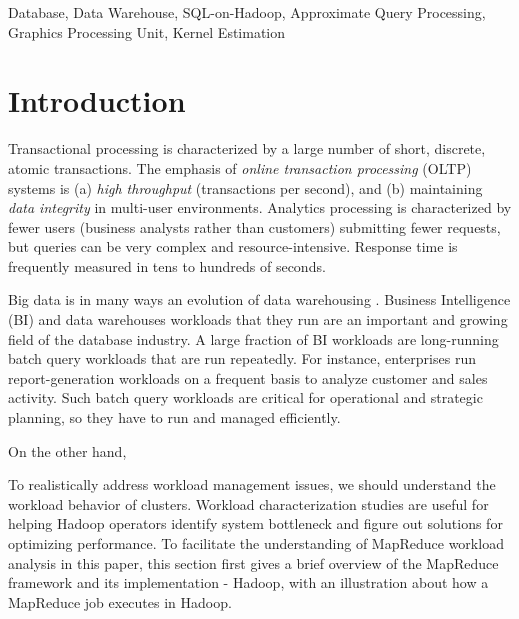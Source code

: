 \documentclass[conference]{IEEEtran}
\begin{document}
\begin{IEEEkeywords}
Database, Data Warehouse, SQL-on-Hadoop, Approximate Query Processing, Graphics Processing Unit, Kernel Estimation
\end{IEEEkeywords}

\section{Introduction}
\label{sc:Introduction}
Transactional processing is characterized by a large number of short, discrete, atomic transactions. 
The emphasis of \textit{online transaction processing} (OLTP) systems is (a) \textit{high throughput }(transactions per second), 
and (b) maintaining \textit{data integrity} in multi-user environments.
Analytics processing is characterized by fewer users (business analysts rather than customers) submitting fewer requests, 
but queries can be very complex and resource-intensive. Response time is frequently measured in tens to hundreds of seconds.

Big data is in many ways an evolution of data warehousing \cite{Zaharia:2010}.
Business Intelligence (BI) and data warehouses workloads that they run are an important and growing field of the database industry.
A large fraction of BI workloads are long-running batch query workloads that are run repeatedly.
For instance, enterprises run report-generation workloads on a frequent basis to analyze customer and sales activity.
Such batch query workloads are critical for operational and strategic planning, so they have to run and managed efficiently.

On the other hand, 

To realistically address workload management issues, we should understand the workload behavior of clusters.
Workload characterization studies are useful for helping Hadoop operators identify system bottleneck and figure out solutions for optimizing performance.
To facilitate the understanding of MapReduce workload analysis in this paper, this section first gives a brief overview of the MapReduce framework and its implementation - Hadoop, with an illustration about how a MapReduce job executes in Hadoop.

\end{document}
